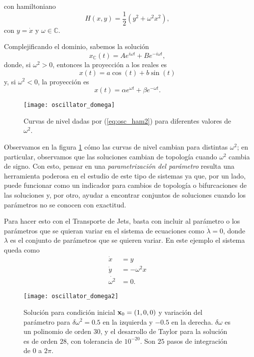 con hamiltoniano
\begin{equation}
 H(x,y) = \frac{1}{2} \left( y^2 + \omega ^2 x^2 \right),
 \label{eq:osc_ham2}
\end{equation}
con $y = \dot{x}$ y $\omega \in \mathbb{C}$.

Complejificando el dominio, sabemos la solución
\begin{equation*}
 x_{\mathbb{C}}(t) = A e^{i\omega t} + B e^{-i \omega t},
\end{equation*}
donde, si $\omega^2 > 0$, entonces la proyección a los reales es
\begin{equation}
 x(t) = a \cos(t) + b \sin (t)
 \label{eq:ho_solution_trig}
\end{equation}
y, si $\omega^2 < 0$, la proyección es
\begin{equation}
 x(t) = \alpha e^{\omega t} + \beta e^{- \omega t}.
 \label{eq:ho_solution_exp}
\end{equation}

\begin{figure}[h!]
 \centering
 \texttt{[image: oscillator\_domega]}
 \caption{Curvas de nivel dadas por (\ref{eq:osc_ham2}) para diferentes valores de $\omega^2$.}
 \label{fig:oscillator_domega}
\end{figure}

Observamos en la figura \ref{fig:oscillator_domega} cómo las curvas de nivel cambian para distintas $\omega^2$; en particular, observamos que las soluciones cambian de topología cuando $\omega^2$ cambia de signo. Con esto, pensar en una \textit{parametrización del parámetro} resulta una herramienta poderosa en el estudio de este tipo de sistemas ya que, por un lado, puede funcionar como un indicador para cambios de topología o bifurcaciones de las soluciones y, por otro, ayudar a encontrar conjuntos de soluciones cuando los parámetros no se conocen con exactitud. 

Para hacer esto con el Transporte de Jets, basta con incluir al parámetro o los parámetros que se quieran variar en el sistema de ecuaciones como $\dot{\lambda} = 0$, donde $\lambda$ es el conjunto de parámetros que se quieren variar. En este ejemplo el sistema queda como
\begin{align*}
 \dot{x} &= y \\
 \dot{y} &= - \omega^2 x \\
 \dot{\omega^2} &= 0.
\end{align*}
 
\begin{figure}[h!]
 \centering 
 \texttt{[image: oscillator\_domega2]}
 \caption{Solución para condición inicial $\mathbf{x}_0 = (1,0,0)$ y variación del parámetro para $\delta \omega^2 = 0.5$ en la izquierda y $-0.5$ en la derecha. $\delta \omega$ es un polinomio de orden $30$, y el desarrollo de Taylor para la solución es de orden $28$, con tolerancia de $10^{-20}$. Son $25$ pasos de integración de $0$ a $2 \pi$.}
 \label{fig:oscillator_param_transport}
\end{figure}

